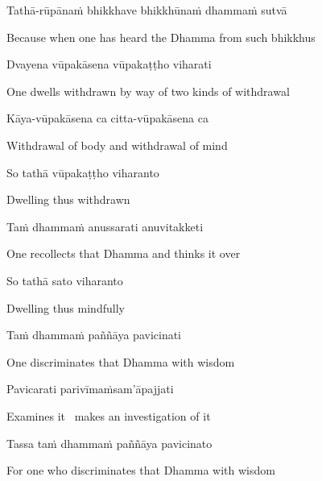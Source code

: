 \begin{pali-hang}
Tathā-rūpānaṁ bhikkhave bhikkhūnaṁ dhammaṁ sutvā
\end{pali-hang}

\begin{english-hang}
  Because when one has heard the Dhamma from such bhikkhus
\end{english-hang}

Dvayena vūpakāsena vūpakaṭṭho viharati

\begin{english-hang}
  One dwells withdrawn by way of two kinds of withdrawal
\end{english-hang}

Kāya-vūpakāsena ca citta-vūpakāsena ca

\begin{english}
  Withdrawal of body and withdrawal of mind
\end{english}

So tathā vūpakaṭṭho viharanto

\begin{english}
  Dwelling thus withdrawn
\end{english}

\ifafive\clearpage\fi
\ifbfive\clearpage\fi

Taṁ dhammaṁ anussarati anuvitakketi

\begin{english}
  One recollects that Dhamma and thinks it over
\end{english}

So tathā sato viharanto

\begin{english}
  Dwelling thus mindfully
\end{english}

Taṁ dhammaṁ paññāya pavicinati

\begin{english}
  One discriminates that Dhamma with wisdom
\end{english}

\ifninebythirteen\clearpage\fi

Pavicarati parivīmaṁsam'āpajjati

\begin{english}
  Examines it \breathmark\ makes an investigation of it
\end{english}

Tassa taṁ dhammaṁ paññāya pavicinato

\begin{english}
  For one who discriminates that Dhamma with wisdom
\end{english}

